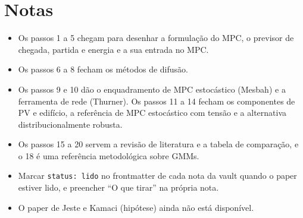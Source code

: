 \documentclass[11pt,a4paper]{article}
\begin{document}
\section*{Notas}

\begin{itemize}
  \item Os passos 1 a 5 chegam para desenhar a formulação do MPC, o previsor de chegada, partida e energia e a sua entrada no MPC.
  \item Os passos 6 a 8 fecham os métodos de difusão.
  \item Os passos 9 e 10 dão o enquadramento de MPC estocástico (Mesbah) e a ferramenta de rede (Thurner). Os passos 11 a 14 fecham os componentes de PV e edifício, a referência de MPC estocástico com tensão e a alternativa distribucionalmente robusta.
  \item Os passos 15 a 20 servem a revisão de literatura e a tabela de comparação, e o 18 é uma referência metodológica sobre GMMs.
  \item Marcar \texttt{status: lido} no frontmatter de cada nota da vault quando o paper estiver lido, e preencher ``O que tirar'' na própria nota.
  \item O paper de Jeste e Kamaci (hipótese) ainda não está disponível.
\end{itemize}
\end{document}
